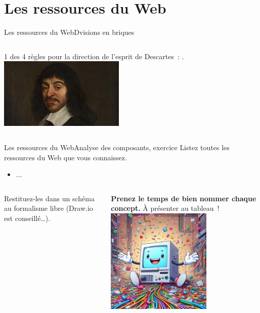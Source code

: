 \documentclass{beamer}
\begin{document}
    \section{Les ressources du Web}\label{sec:ressources}

    \begin{frame}{Les ressources du Web}{Dvisions en briques}
        \begin{columns}
            1 des 4 règles pour la direction de l'esprit de Descartes~: .
            \centering
            \includegraphics[width=6cm]{image/Descartes}
        \end{columns}
    \end{frame}

    \begin{frame}{Les ressources du Web}{Analyse des composants, exercice \execcounterdispinc{}}
        Listez toutes les ressources du Web que vous connaissez.
        \begin{itemize}
            \item ...
        \end{itemize}
        \bigbreak
        \begin{columns}
            Restituez-les dans un schéma au formalisme libre (Draw.io est conseillé\ldots).

            \textbf{Prenez le temps de bien nommer chaque concept.}
            \bigbreak
            À présenter au tableau~!
            \centering
            \includegraphics[width=5cm]{image/computer-n-web-ressources}
        \end{columns}
    \end{frame}
\end{document}
